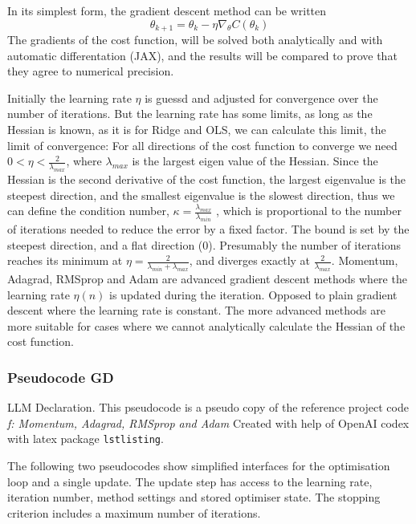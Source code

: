 \documentclass[aps,rmp,reprint,raggedbottom,amsmath,amssymb,longbibliography]{revtex4-1}
\begin{document}
In its simplest form, the gradient descent method can be written
\begin{equation}
  \theta_{k+1} = \theta_k - \eta\nabla_{\theta}C(\theta_k)
\end{equation}
\cite{Project1}
The gradients of the cost function, will be solved both analytically
and with automatic differentation (JAX), and the results will be compared
to prove that they agree to numerical precision.

Initially the learning rate $\eta$ is guessd and adjusted for convergence
over the number of iterations. But the learning rate has some limits,
as long as the Hessian is known, as it is for Ridge and OLS, we can 
calculate this limit, the limit of convergence:
For all directions of the cost function to converge we need
$0 < \eta < \frac{2}{\lambda_{max}}$, where $\lambda_{max}$ is 
the largest eigen value of the Hessian. Since the Hessian is the 
second derivative of the cost function, the largest eigenvalue
is the steepest direction, and the smallest eigenvalue is the 
slowest direction, thus we can define the condition number, $\kappa = \frac{\lambda_{max}}{\lambda_{min}}$
, which is proportional to the number of iterations needed to reduce
the error by a fixed factor. The bound is set by the steepest direction,
and a flat direction (0). Presumably the number of iterations reaches 
its minimum at $\eta = \frac{2}{\lambda_{min}+\lambda_{max}}$, and diverges
exactly at $\frac{2}{\lambda_{max}}$. \newline 
Momentum, Adagrad, RMSprop and Adam are advanced gradient descent methods
where the learning rate $\eta(n)$ is updated during the iteration.
Opposed to plain gradient descent where the learning rate is constant.
The more advanced methods are more suitable for cases where we cannot
analytically calculate the Hessian of the cost function. 

\subsubsection{Pseudocode GD}
LLM Declaration. This pseudocode is a pseudo copy of the reference project code \textit{f: Momentum, Adagrad, RMSprop and Adam}
\cite{Timholmen96FYSSTK4155Prosjektarbeid} Created with help of OpenAI codex \cite{Codex} with latex package \texttt{lstlisting}.

The following two pseudocodes show simplified interfaces for the optimisation
loop and a single update. The update step has access to the learning rate,
iteration number, method settings and stored optimiser state. The stopping
criterion includes a maximum number of iterations.
\end{document}
